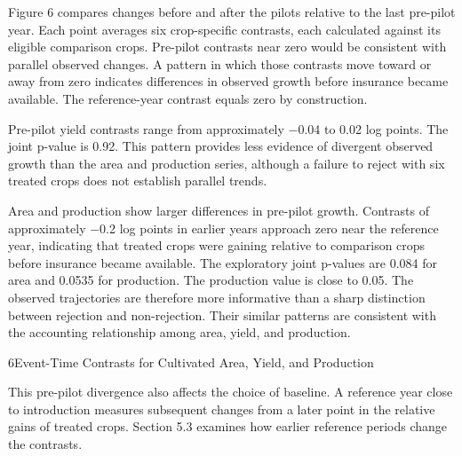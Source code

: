 

Figure 6 compares changes before and after the pilots relative to the last pre-pilot year. Each point averages six crop-specific contrasts, each calculated against its eligible comparison crops. Pre-pilot contrasts near zero would be consistent with parallel observed changes. A pattern in which those contrasts move toward or away from zero indicates differences in observed growth before insurance became available. The reference-year contrast equals zero by construction.

Pre-pilot yield contrasts range from approximately −0.04 to 0.02 log points. The joint p-value is 0.92. This pattern provides less evidence of divergent observed growth than the area and production series, although a failure to reject with six treated crops does not establish parallel trends.

Area and production show larger differences in pre-pilot growth. Contrasts of approximately −0.2 log points in earlier years approach zero near the reference year, indicating that treated crops were gaining relative to comparison crops before insurance became available. The exploratory joint p-values are 0.084 for area and 0.0535 for production. The production value is close to 0.05. The observed trajectories are therefore more informative than a sharp distinction between rejection and non-rejection. Their similar patterns are consistent with the accounting relationship among area, yield, and production.

\begin{wordfigure}{6}{Event-Time Contrasts for Cultivated Area, Yield, and Production}
\end{wordfigure}

This pre-pilot divergence also affects the choice of baseline. A reference year close to introduction measures subsequent changes from a later point in the relative gains of treated crops. Section 5.3 examines how earlier reference periods change the contrasts.

